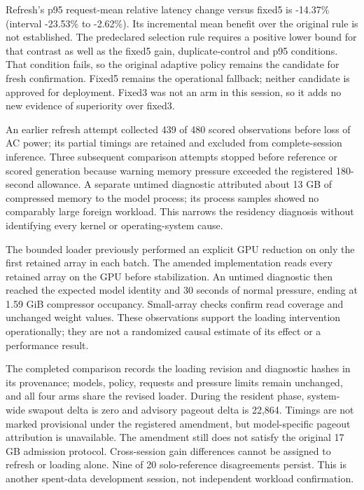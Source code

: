 \documentclass[
  11pt,
]{article}
\begin{document}
Refresh's p95 request-mean relative latency change versus fixed5 is
-14.37\% (interval -23.53\% to -2.62\%). Its incremental mean benefit
over the original rule is not established. The predeclared selection
rule requires a positive lower bound for that contrast as well as the
fixed5 gain, duplicate-control and p95 conditions. That condition fails,
so the original adaptive policy remains the candidate for fresh
confirmation. Fixed5 remains the operational fallback; neither candidate
is approved for deployment. Fixed3 was not an arm in this session, so it
adds no new evidence of superiority over fixed3.

An earlier refresh attempt collected 439 of 480 scored observations
before loss of AC power; its partial timings are retained and excluded
from complete-session inference. Three subsequent comparison attempts
stopped before reference or scored generation because warning memory
pressure exceeded the registered 180-second allowance. A separate
untimed diagnostic attributed about 13 GB of compressed memory to the
model process; its process samples showed no comparably large foreign
workload. This narrows the residency diagnosis without identifying every
kernel or operating-system cause.

The bounded loader previously performed an explicit GPU reduction on
only the first retained array in each batch. The amended implementation
reads every retained array on the GPU before stabilization. An untimed
diagnostic then reached the expected model identity and 30 seconds of
normal pressure, ending at 1.59 GiB compressor occupancy. Small-array
checks confirm read coverage and unchanged weight values. These
observations support the loading intervention operationally; they are
not a randomized causal estimate of its effect or a performance result.

The completed comparison records the loading revision and diagnostic
hashes in its provenance; models, policy, requests and pressure limits
remain unchanged, and all four arms share the revised loader. During the
resident phase, system-wide swapout delta is zero and advisory pageout
delta is 22,864. Timings are not marked provisional under the registered
amendment, but model-specific pageout attribution is unavailable. The
amendment still does not satisfy the original 17 GB admission protocol.
Cross-session gain differences cannot be assigned to refresh or loading
alone. Nine of 20 solo-reference disagreements persist. This is another
spent-data development session, not independent workload confirmation.
\end{document}
